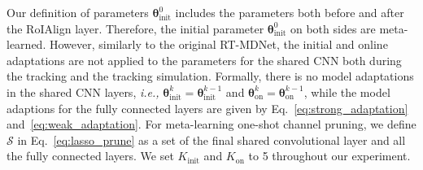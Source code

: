 \documentclass[letterpaper]{article} %
\def \thetainit{{\boldsymbol{\theta}_\text{init}^0}}
\def \thetainitadapt{\boldsymbol{\theta}_\text{init}}
\def \thetaonlineadapt{\boldsymbol{\theta}_\text{on}}
\def \Kinit{K_\text{init}}
\def \Konline{K_\text{on}}
\begin{document}
Our definition of parameters $\thetainit$ includes the parameters both before and after the RoIAlign layer.
Therefore, the initial parameter $\thetainit$ on both sides are meta-learned.
However, similarly to the original RT-MDNet, the initial and online adaptations are not applied to the parameters for the shared CNN both during the tracking and the tracking simulation.
Formally, there is no model adaptations in the shared CNN layers, {\it i.e.,} $\thetainitadapt^k=\thetainitadapt^{k-1}$ and $\thetaonlineadapt^k=\thetaonlineadapt^{k-1}$, while the model adaptions for the fully connected layers are given by Eq.~\eqref{eq:strong_adaptation} and~\eqref{eq:weak_adaptation}.
For meta-learning one-shot channel pruning, we define $\mathcal{S}$ in Eq.~\eqref{eq:lasso_prune} as a set of the final shared convolutional layer and all the fully connected layers.
We set $\Kinit$ and $\Konline$ to 5 throughout our experiment.
\end{document}
